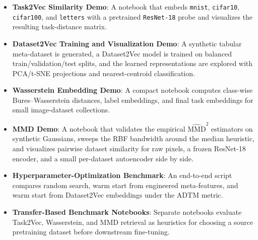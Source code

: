\documentclass[peerreview]{IEEEtran}
\begin{document}
\begin{itemize}
    \item \textbf{Task2Vec Similarity Demo}: A notebook that embeds
    \texttt{mnist}, \texttt{cifar10}, \texttt{cifar100}, and
    \texttt{letters} with a pretrained \texttt{ResNet-18} probe and
    visualizes the resulting task-distance matrix.
    \item \textbf{Dataset2Vec Training and Visualization Demo}: A
    synthetic tabular meta-dataset is generated, a Dataset2Vec model
    is trained on balanced train/validation/test splits, and the
    learned representations are explored with PCA/t-SNE projections
    and nearest-centroid classification.
    \item \textbf{Wasserstein Embedding Demo}: A compact notebook
    computes class-wise Bures--Wasserstein distances, label embeddings,
    and final task embeddings for small image-dataset collections.
    \item \textbf{MMD Demo}: A notebook that validates the empirical
    $\widehat{\mathrm{MMD}}^{2}$ estimators on synthetic Gaussians,
    sweeps the RBF bandwidth around the median heuristic, and
    visualizes pairwise dataset similarity for raw pixels, a frozen
    ResNet-18 encoder, and a small per-dataset autoencoder side by
    side.
    \item \textbf{Hyperparameter-Optimization Benchmark}: An
    end-to-end script compares random search, warm start from
    engineered meta-features, and warm start from Dataset2Vec
    embeddings under the ADTM metric.
    \item \textbf{Transfer-Based Benchmark Notebooks}: Separate
    notebooks evaluate Task2Vec, Wasserstein, and MMD retrieval as
    heuristics for choosing a source pretraining dataset before
    downstream fine-tuning.
\end{itemize}



\end{document}
